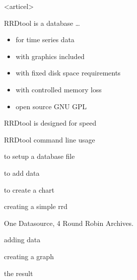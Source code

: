 \mode<articel>{\tableofcontents}

\begin{frame}{RRDtool is a database \ldots}
\begin{itemize}[<+-| alert@+>]
\item for time series data
\item with graphics included
\item with fixed disk space requirements
\item with controlled memory loss
\item open source GNU GPL
\end{itemize}
\end{frame}

\begin{frame}{RRDtool is designed for speed}
\end{frame}

\begin{frame}{RRDtool command line usage}
\begin{description}[<+-| alert@+>]
\item[\texttt{rrdtool create}] to setup a database file
\item[\texttt{rrdtool update}] to add data
\item[\texttt{rrdtool graph}] to create a chart
\end{description}
\end{frame}


\begin{frame}{creating a simple rrd}

One Datasource, 4 Round Robin Archives.
\end{frame}

\begin{frame}{adding data}

\end{frame}

\begin{frame}{creating a graph}

\end{frame}

\begin{frame}{the result}
\end{frame}

